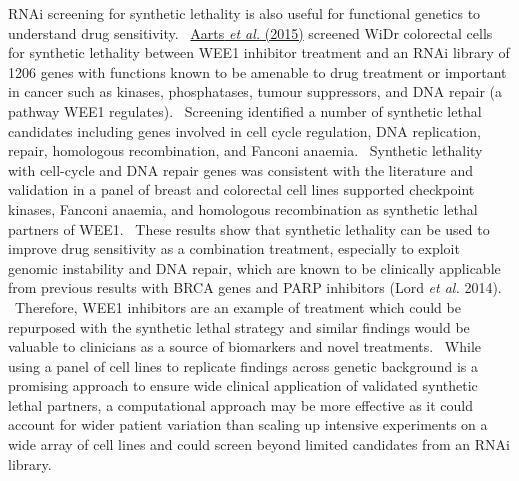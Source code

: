 RNAi screening for synthetic lethality is also useful for functional
genetics to understand drug sensitivity.
\ \hyperlink{ENREF1}{Aarts}\hyperlink{ENREF1}{\textit{ et
al.}}\hyperlink{ENREF1}{ (2015)} screened WiDr colorectal cells for
synthetic lethality between WEE1 inhibitor treatment and an RNAi
library of 1206 genes with functions known to be amenable to drug
treatment or important in cancer such as kinases, phosphatases, tumour
suppressors, and DNA repair (a pathway WEE1 regulates). \ Screening
identified a number of synthetic lethal candidates including genes
involved in cell cycle regulation, DNA replication, repair, homologous
recombination, and Fanconi anaemia. \ Synthetic lethality with
cell-cycle and DNA repair genes was consistent with the literature and
validation in a panel of breast and colorectal cell lines supported
checkpoint kinases, Fanconi anaemia, and homologous recombination as
synthetic lethal partners of WEE1. \ These results show that synthetic
lethality can be used to improve drug sensitivity as a combination
treatment, especially to exploit genomic instability and DNA repair,
which are known to be clinically applicable from previous results with
BRCA genes and PARP inhibitors (Lord\textit{ et al.} 2014).
\ Therefore, WEE1 inhibitors are an example of treatment which could be
repurposed with the synthetic lethal strategy and similar findings
would be valuable to clinicians as a source of biomarkers and novel
treatments. \ While using a panel of cell lines to replicate findings
across genetic background is a promising approach to ensure wide
clinical application of validated synthetic lethal partners, a
computational approach may be more effective as it could account for
wider patient variation than scaling up intensive experiments on a wide
array of cell lines and could screen beyond limited candidates from an
RNAi library. \ 


